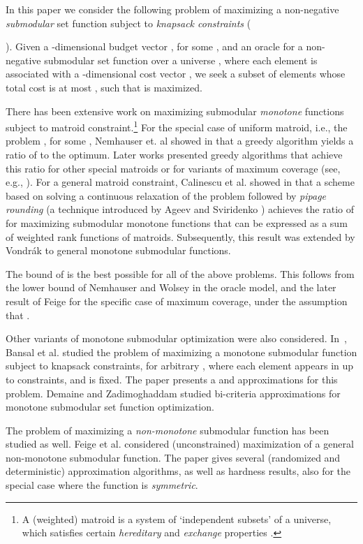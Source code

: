 \documentclass[11pt]{article}
\begin{document}
In this paper we consider the following
problem of maximizing a non-negative {\em submodular}
set function subject to 
{\em knapsack constraints} ({). Given a -dimensional
budget vector , for some , and an oracle for a
non-negative submodular set function  over a universe ,
where each element  is associated with a -dimensional
cost vector , we seek a subset of elements 
whose total cost is at most , such that  is maximized.

There has been extensive work on maximizing submodular {\em monotone}
functions subject to matroid constraint.\footnote{A (weighted)
matroid is a system of `independent subsets' of a universe, which
satisfies certain {\em hereditary} and {\em exchange} properties
\cite{Sch03}.} For the special case of uniform matroid,
i.e., the problem
, for some , Nemhauser et. al
showed in \cite{NWF78}
that a greedy algorithm yields a ratio of  to the
optimum. Later works presented greedy algorithms that achieve this
ratio for other special matroids or for
variants of maximum coverage (see, e.g., \cite{as04,
kmn99,s04,CK04}).
For a general matroid constraint, Calinescu et al. showed in
\cite{ccpv07} that a scheme based on solving a continuous
relaxation of the problem followed by {\em pipage rounding} (a
technique introduced by Ageev and Sviridenko \cite{as04}) achieves
the ratio of  for maximizing submodular monotone
functions that can be expressed as a sum of weighted rank
functions of matroids. Subsequently, this result was extended by
Vondr\'{a}k \cite{Vo08} to general monotone submodular functions.

 The bound of  is the best possible for all of the
above problems. This follows from the lower bound of Nemhauser and
Wolsey \cite{nw78} in the oracle model, and the later result of
Feige \cite{f98} for the specific case of maximum coverage, under
the assumption that .

Other variants of monotone submodular optimization were also considered.
In~\cite{BKNS10}, Bansal et al. studied the problem of maximizing a monotone submodular function
subject to  knapsack constraints, for arbitrary , where each element appears in up to 
constraints, and  is fixed. The paper presents a  and
 approximations for
this problem. Demaine and Zadimoghaddam \cite{DZ10} studied
bi-criteria approximations for monotone submodular set function
optimization.

The problem of maximizing a {\em non-monotone} submodular function has been studied as well. Feige et al. \cite{FMV07}
 considered (unconstrained) maximization of a  general non-monotone submodular function.
 The paper gives several (randomized and deterministic)
approximation algorithms, as well as hardness results, also for the special case
where the function is {\em symmetric}.

}
\end{document}
